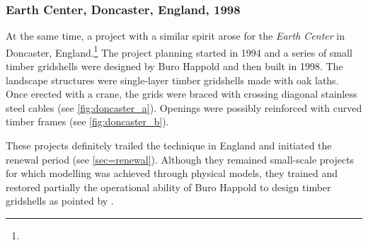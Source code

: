 \subsubsection{Earth Center, Doncaster, England, 1998}
At the same time, a project with a similar spirit arose for the \emph{Earth Center} in Doncaster, England.\footnote{} The project planning started in 1994 and a series of small timber gridshells were designed by Buro Happold and then built in 1998. The landscape structures were single-layer timber gridshells made with oak laths. Once erected with a crane, the grids were braced with crossing diagonal stainless steel cables (see \cref{fig:doncaster_a}). Openings were possibly reinforced with curved timber frames (see \cref{fig:doncaster_b}).

These projects definitely trailed the technique in England and initiated the renewal period (see \cref{sec=renewal}). Although they remained small-scale projects for which modelling was achieved through physical models, they trained and restored partially the operational ability of Buro Happold to design timber gridshells as pointed by \citet{Harris2003}.





